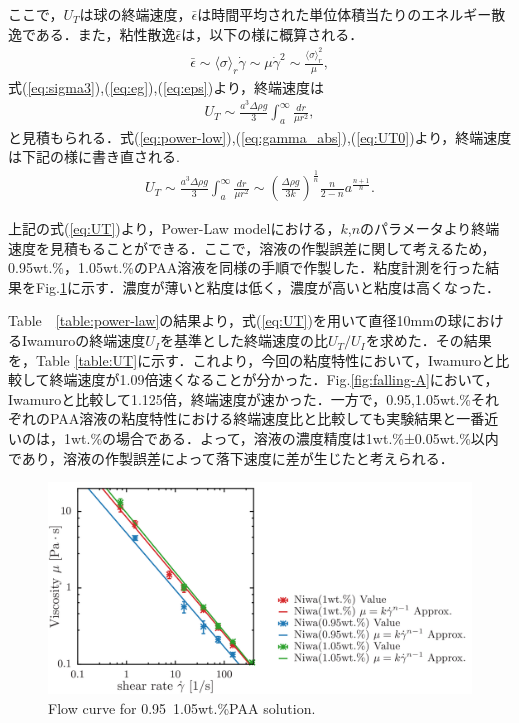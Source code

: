 ここで，$U_T$は球の終端速度，$\bar{\epsilon}$は時間平均された単位体積当たりのエネルギー散逸である．また，粘性散逸$\bar{\epsilon}$は，以下の様に概算される．
\begin{eqnarray}
    \bar{\epsilon} \sim \langle\sigma\rangle_r\dot{\gamma} \sim \mu \dot{\gamma}^2 \sim \frac{\langle\sigma\rangle_r^2}{\mu} ,
    \label{eq:eps}
\end{eqnarray}
式(\ref{eq:sigma3}),(\ref{eq:eg}),(\ref{eq:eps})より，終端速度は
\begin{eqnarray}
    U_T \sim \frac{a^3\Delta\rho g}{3}\int_a^\infty\frac{dr}{\mu r^2} ,
    \label{eq:UT0}
\end{eqnarray}
と見積もられる．式(\ref{eq:power-low}),(\ref{eq:gamma_abs}),(\ref{eq:UT0})より，終端速度は下記の様に書き直される.
\begin{eqnarray}
    U_T \sim \frac{a^3\Delta\rho g}{3}  \int^{\infty}_{a} \frac{dr}{\mu r^2} \sim \left(\frac{\Delta \rho g}{3k}\right)^{\frac{1}{n}}\frac{n}{2-n}a^{\frac{n+1}{n}} .
    \label{eq:UT}
\end{eqnarray}

上記の式(\ref{eq:UT})より，Power-Law modelにおける，$k$,$n$のパラメータより終端速度を見積もることができる．ここで，溶液の作製誤差に関して考えるため，0.95wt.\%，1.05wt.\%のPAA溶液を同様の手順で作製した．粘度計測を行った結果をFig.\ref{fig:95-105}に示す．濃度が薄いと粘度は低く，濃度が高いと粘度は高くなった．

Table　\ref{table:power-law}の結果より，式(\ref{eq:UT})を用いて直径10mmの球におけるIwamuro\cite{ref:8}の終端速度$U_I$を基準とした終端速度の比$U_T/U_{I}$を求めた．その結果を，Table \ref{table:UT}に示す．これより，今回の粘度特性において，Iwamuro\cite{ref:8}と比較して終端速度が1.09倍速くなることが分かった．Fig.\ref{fig:falling-A}において，Iwamuro\cite{ref:8}と比較して1.125倍，終端速度が速かった．一方で，0.95,1.05wt.\%それぞれのPAA溶液の粘度特性における終端速度比と比較しても実験結果と一番近いのは，1wt.\%の場合である．よって，溶液の濃度精度は1wt.\%±0.05wt.\%以内であり，溶液の作製誤差によって落下速度に差が生じたと考えられる．

\begin{figure}[ht]
    \includegraphics[width=15cm,clip]{5-Discussion/95-105.png}
    \caption{Flow curve for 0.95~1.05wt.\%PAA solution.}
    \label{fig:95-105}
\end{figure}

